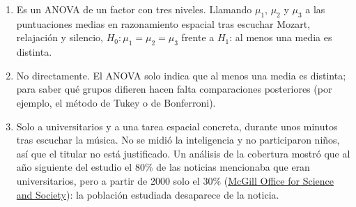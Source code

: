 \documentclass[
  spanish,
  a4paper,
]{scrreport}
\theoremstyle{definition}
\theoremstyle{remark}
\begin{document}
\begin{tcolorbox}[enhanced jigsaw, arc=.35mm, bottomrule=.15mm, bottomtitle=1mm, breakable, colback=white, colbacktitle=quarto-callout-tip-color!10!white, colframe=quarto-callout-tip-color-frame, coltitle=black, left=2mm, leftrule=.75mm, opacityback=0, opacitybacktitle=0.6, rightrule=.15mm, title=\textcolor{quarto-callout-tip-color}{\faLightbulb}\hspace{0.5em}{Solución}, titlerule=0mm, toprule=.15mm, toptitle=1mm]

\begin{enumerate}
\def\labelenumi{\alph{enumi}.}
\item
  Es un ANOVA de un factor con tres niveles. Llamando \(\mu_1\),
  \(\mu_2\) y \(\mu_3\) a las puntuaciones medias en razonamiento
  espacial tras escuchar Mozart, relajación y silencio,
  \(H_0: \mu_1=\mu_2=\mu_3\) frente a \(H_1\): al menos una media es
  distinta.
\item
  No directamente. El ANOVA solo indica que al menos una media es
  distinta; para saber qué grupos difieren hacen falta comparaciones
  posteriores (por ejemplo, el método de Tukey o de Bonferroni).
\item
  Solo a universitarios y a una tarea espacial concreta, durante unos
  minutos tras escuchar la música. No se midió la inteligencia y no
  participaron niños, así que el titular no está justificado. Un
  análisis de la cobertura mostró que al año siguiente del estudio el
  \(80\)\% de las noticias mencionaba que eran universitarios, pero a
  partir de 2000 solo el \(30\)\%
  (\href{https://www.mcgill.ca/oss/node/9857}{McGill Office for Science
  and Society}): la población estudiada desaparece de la noticia.
\end{enumerate}

\end{tcolorbox}
\end{document}
